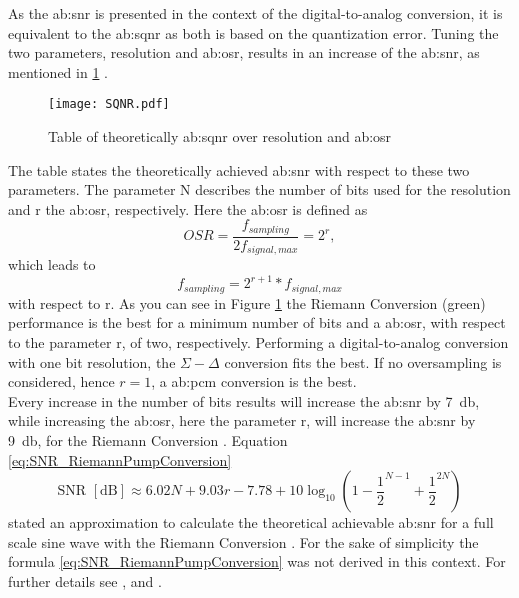 As the \gls{ab:snr} is presented in the context of the digital-to-analog conversion, it is equivalent to the \gls{ab:sqnr} as both is based on the quantization error.
Tuning the two parameters, resolution and \gls{ab:osr}, results in an increase of the \gls{ab:snr},
as mentioned in \ref{fig:TableSQNR} \cite{DevalRivetVeyrac2015}.

\begin{figure}[ht]
	\centering
  \texttt{[image: SQNR.pdf]}
	\caption{Table of theoretically \gls{ab:sqnr} over resolution and \gls{ab:osr} \cite{DevalRivetVeyrac2015}}
	\label{fig:TableSQNR}
\end{figure}

The table states the theoretically achieved \gls{ab:snr} with respect to these two parameters.
The parameter N describes the number of bits used for the resolution and r the \gls{ab:osr}, respectively.
Here the \gls{ab:osr} is defined as
\begin{equation}
OSR =  \frac{f_{sampling}}{2 f_{signal,max}} = 2^r,
\end{equation}
which leads to
\begin{equation}
f_{sampling} =  2^{r+1}*f_{signal,max}
\end{equation}
with respect to r.
As you can see in Figure \ref{fig:TableSQNR} the Riemann Conversion (green) performance is the best for a minimum number of bits and a \gls{ab:osr}, with respect to the parameter r, of two, respectively.
Performing a digital-to-analog conversion with one bit resolution, the $\Sigma - \Delta$ conversion fits the best.
If no oversampling is considered, hence $ r = 1$, a \gls{ab:pcm} conversion is the best.\\
Every increase in the number of bits results will increase the \gls{ab:snr} by \SI{7}{\decibel}, while increasing the \gls{ab:osr}, here the parameter r, will increase the \gls{ab:snr} by \SI{9}{\decibel}, for the Riemann Conversion \cite{VeyracRivetDevalEtAl2016}.
Equation \ref{eq:SNR_RiemannPumpConversion}
\begin{equation}
	\text{SNR } [\si{\dB}] \approx 6.02N + 9.03r - 7.78 + 10\log_{10}(1 - \frac{1}{2}^{N-1} + \frac{1}{2}^{2N})
	\label{eq:SNR_RiemannPumpConversion}
\end{equation}
stated an approximation to calculate the theoretical achievable \gls{ab:snr} for a full scale sine wave with the Riemann Conversion \citep{DevalRivetVeyrac2015}.
For the sake of simplicity the formula \ref{eq:SNR_RiemannPumpConversion} was not derived in this context.
For further details see \cite{VeyracRivetDevalEtAl2014},\cite{VeyracRivetDevalEtAl2016} and \cite{Kester2009}.

